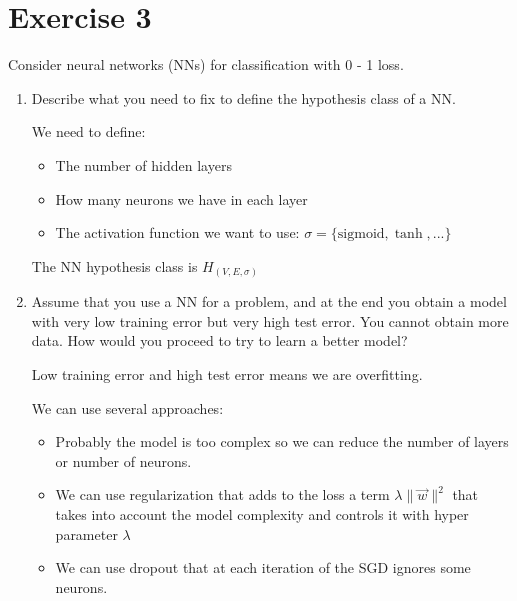 \documentclass[a4paper,11pt,oneside]{book}
\begin{document}
\clearpage
\section{Exercise 3}
    Consider neural networks (NNs) for classification with 0 - 1 loss.
    \begin{enumerate}
        \item Describe what you need to fix to define the hypothesis class of a NN.
        \begin{solution}
            We need to define:
            \begin{itemize}
            \item The number of hidden layers
            \item How many neurons we have in each layer
            \item The activation function we want to use: $\sigma = \{\text{sigmoid}, \tanh, ...\}$
            \end{itemize}
            
            The NN hypothesis class is $H_{(V,E,\sigma)}$
        \end{solution}
        \item Assume that you use a NN for a problem, and at the end you obtain a model with very low training error but very high test error. You cannot obtain more data. How would you proceed to try to learn a better model?
        \begin{solution}
            Low training error and high test error means we are overfitting.

            We can use several approaches:
            \begin{itemize}
            \item Probably the model is too complex so we can reduce the number of layers or number of neurons.

            \item We can use regularization that adds to the loss a term $\lambda\|\vec{w}\|^2$ that takes into account the model complexity and controls it with hyper parameter $\lambda$

            \item We can use dropout that at each iteration of the SGD ignores some neurons.


\end{itemize}
\end{solution}
\end{enumerate}
\end{document}
